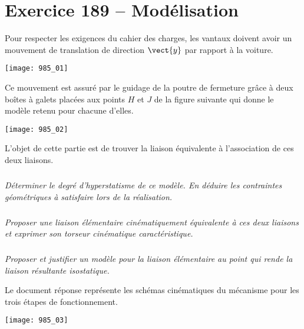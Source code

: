 \section*{Exercice 189 -- Modélisation}
\setcounter{exo}{0}

Pour respecter les exigences du cahier des charges, les vantaux doivent avoir un
mouvement de translation de direction $\vect{y}$ par rapport à la voiture. 

\begin{center}
\texttt{[image: 985\_01]}%
\end{center}

Ce mouvement est assuré par le guidage de la poutre de fermeture grâce à
deux boîtes à galets placées aux points $H$ et $J$ de la figure suivante qui donne le
modèle retenu pour chacune d’elles. 

\begin{center}
\texttt{[image: 985\_02]}%
\end{center}

\begin{obj}
L’objet de cette partie est de trouver la liaison équivalente à l’association de ces
deux liaisons.
\end{obj}

\subparagraph{}
\textit{Déterminer le degré d’hyperstatisme de ce modèle. En déduire les contraintes géométriques à satisfaire lors de la réalisation.}
\ifprof
\begin{corrige}
\end{corrige}
\else
\fi

\subparagraph{}
\textit{Proposer une liaison élémentaire cinématiquement équivalente à ces deux
liaisons et exprimer son torseur cinématique caractéristique.}
\ifprof
\begin{corrige}
\end{corrige}
\else
\fi

\subparagraph{}
\textit{Proposer et justifier un modèle pour la liaison élémentaire au point qui rende la liaison résultante isostatique.}
\ifprof
\begin{corrige}
\end{corrige}
\else
\fi

Le document réponse représente les schémas cinématiques du mécanisme pour les trois étapes de fonctionnement.


\begin{center}
\texttt{[image: 985\_03]}%
\end{center}


